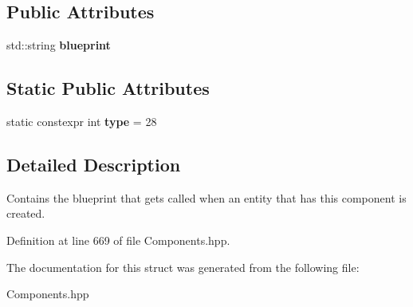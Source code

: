 \subsection*{Public Attributes}
\begin{DoxyCompactItemize}
\item 
std\+::string {\bfseries blueprint}\hypertarget{struct_constructor_component_ac10137b6a5638c4d559ac86bf3207913}{}\label{struct_constructor_component_ac10137b6a5638c4d559ac86bf3207913}

\end{DoxyCompactItemize}
\subsection*{Static Public Attributes}
\begin{DoxyCompactItemize}
\item 
static constexpr int {\bfseries type} = 28\hypertarget{struct_constructor_component_af2c0bb91fbb21625a0eb5c24f2d4589a}{}\label{struct_constructor_component_af2c0bb91fbb21625a0eb5c24f2d4589a}

\end{DoxyCompactItemize}


\subsection{Detailed Description}
Contains the blueprint that gets called when an entity that has this component is created. 

Definition at line 669 of file Components.\+hpp.



The documentation for this struct was generated from the following file\+:\begin{DoxyCompactItemize}
\item 
Components.\+hpp\end{DoxyCompactItemize}
